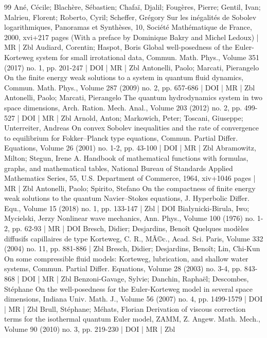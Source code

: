 \documentclass[10pt]{amsart}
\theoremstyle{definition}\newtheorem{defi}[theo]{Definition}\newtheorem{rema}[theo]{Remark}\newtheorem{exam}[theo]{Example}\newtheorem{exem}[theo]{Example}\newtheorem{nota}[theo]{Notation}
\newcommand*\<{\left\langle}
\renewcommand*\>{\right\rangle}
\begin{document}
\begin{thebibliography}{99}
Ané, Cécile; Blachère, Sébastien; Chafaï, Djalil; Fougères, Pierre; Gentil, Ivan; Malrieu, Florent; Roberto, Cyril; Scheffer, Grégory Sur les inégalités de Sobolev logarithmiques, Panoramas et Synthèses, 10, Société Mathématique de France, 2000, xvi+217 pages (With a preface by Dominique Bakry and Michel Ledoux) | MR | Zbl
Audiard, Corentin; Haspot, Boris Global well-posedness of the Euler-Korteweg system for small irrotational data, Commun. Math. Phys., Volume 351 (2017) no. 1, pp. 201-247 | DOI | MR | Zbl
Antonelli, Paolo; Marcati, Pierangelo On the finite energy weak solutions to a system in quantum fluid dynamics, Commun. Math. Phys., Volume 287 (2009) no. 2, pp. 657-686 | DOI | MR | Zbl
Antonelli, Paolo; Marcati, Pierangelo The quantum hydrodynamics system in two space dimensions, Arch. Ration. Mech. Anal., Volume 203 (2012) no. 2, pp. 499-527 | DOI | MR | Zbl
Arnold, Anton; Markowich, Peter; Toscani, Giuseppe; Unterreiter, Andreas On convex Sobolev inequalities and the rate of convergence to equilibrium for Fokker–Planck type equations, Commun. Partial Differ. Equations, Volume 26 (2001) no. 1-2, pp. 43-100 | DOI | MR | Zbl
Abramowitz, Milton; Stegun, Irene A. Handbook of mathematical functions with formulas, graphs, and mathematical tables, National Bureau of Standards Applied Mathematics Series, 55, U.S. Department of Commerce, 1964, xiv+1046 pages | MR | Zbl
Antonelli, Paolo; Spirito, Stefano On the compactness of finite energy weak solutions to the quantum Navier–Stokes equations, J. Hyperbolic Differ. Equ., Volume 15 (2018) no. 1, pp. 133-147 | Zbl | DOI
Białynicki-Birula, Iwo; Mycielski, Jerzy Nonlinear wave mechanics, Ann. Phys., Volume 100 (1976) no. 1-2, pp. 62-93 | MR | DOI
Bresch, Didier; Desjardins, Benoît Quelques modèles diffusifs capillaires de type Korteweg, C. R., MÃ©c., Acad. Sci. Paris, Volume 332 (2004) no. 11, pp. 881-886 | Zbl
Bresch, Didier; Desjardins, Benoît; Lin, Chi-Kun On some compressible fluid models: Korteweg, lubrication, and shallow water systems, Commun. Partial Differ. Equations, Volume 28 (2003) no. 3-4, pp. 843-868 | DOI | MR | Zbl
Benzoni-Gavage, Sylvie; Danchin, Raphaël; Descombes, Stéphane On the well-posedness for the Euler-Korteweg model in several space dimensions, Indiana Univ. Math. J., Volume 56 (2007) no. 4, pp. 1499-1579 | DOI | MR | Zbl
Brull, Stéphane; Méhats, Florian Derivation of viscous correction terms for the isothermal quantum Euler model, ZAMM, Z. Angew. Math. Mech., Volume 90 (2010) no. 3, pp. 219-230 | DOI | MR | Zbl

\end{thebibliography}
\end{document}
